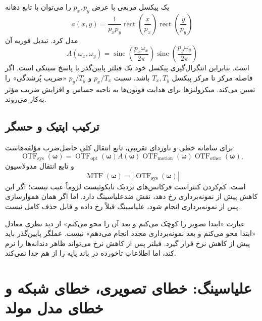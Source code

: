 \documentclass[12pt,openany,oneside]{book}
\newcommand{\abs}[1]{\left\lvert #1\right\rvert}
\newcommand{\vect}[1]{\bm{#1}}
\newcommand{\sinc}{\operatorname{sinc}}
\begin{document}
یک پیکسل مربعی با عرض \(p_x,p_y\) را می‌توان با تابع دهانه
\begin{equation}
a(x,y)=\frac{1}{p_xp_y}
\operatorname{rect}\!\left(\frac{x}{p_x}\right)
\operatorname{rect}\!\left(\frac{y}{p_y}\right)
\end{equation}
مدل کرد. تبدیل فوریه آن
\begin{equation}
A(\omega_x,\omega_y)=
\sinc\!\left(\frac{p_x\omega_x}{2\pi}\right)
\sinc\!\left(\frac{p_y\omega_y}{2\pi}\right)
\end{equation}
است. بنابراین انتگرال‌گیری پیکسل خود یک فیلتر پایین‌گذر با پاسخ سینکی است. اگر فاصله مرکز تا مرکز
پیکسل \(T_x,T_y\) باشد، نسبت \(p_x/T_x\) و \(p_y/T_y\) «ضریب پُرشدگی» را تعیین می‌کند.
میکرولنزها برای هدایت فوتون‌ها به ناحیه حساس و افزایش ضریب مؤثر به‌کار می‌روند.

\subsection{ترکیب اپتیک و حسگر}

برای سامانه خطی و ناوردای تقریبی، تابع انتقال کلی حاصل‌ضرب مؤلفه‌هاست:
\begin{equation}
\operatorname{OTF}_{\mathrm{sys}}(\vect\omega)
=\operatorname{OTF}_{\mathrm{opt}}(\vect\omega)
 A(\vect\omega)
 \operatorname{OTF}_{\mathrm{motion}}(\vect\omega)
 \operatorname{OTF}_{\mathrm{other}}(\vect\omega),
\end{equation}
و تابع انتقال مدولاسیون
\begin{equation}
\operatorname{MTF}(\vect\omega)=
\abs{\operatorname{OTF}_{\mathrm{sys}}(\vect\omega)}
\end{equation}
است. کم‌کردن کنتراست فرکانس‌های نزدیک نایکوئیست لزوماً عیب نیست؛ اگر این کاهش پیش از نمونه‌برداری
رخ دهد، نقش ضدعلیاسینگ دارد. اما اگر همان هموارسازی پس از نمونه‌برداری انجام شود، علیاسینگ
قبلاً رخ داده و قابل حذف کامل نیست.

\begin{warningbox}
عبارت «ابتدا تصویر را کوچک می‌کنم و بعد آن را محو می‌کنم» از دید نظری معادل
«ابتدا محو می‌کنم و بعد نمونه‌برداری مجدد انجام می‌دهم» نیست. عملگر پایین‌گذر باید پیش از کاهش نرخ
قرار گیرد. فیلتر پس از کاهش نرخ می‌تواند ظاهر دندانه‌ها را نرم کند، اما اطلاعاتِ تاخورده در باند پایه
را از هم جدا نمی‌کند.
\end{warningbox}

\section{علیاسینگ: خطای تصویری، خطای شبکه و خطای مدل مولد}
\end{document}

